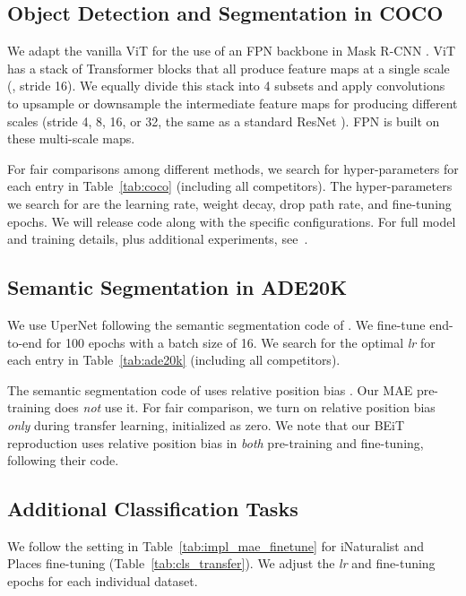 \documentclass[10pt,twocolumn,letterpaper]{article}
\begin{document}
\subsection{Object Detection and Segmentation in COCO}
\label{app:coco}

We adapt the vanilla ViT for the use of an FPN backbone \cite{Lin2017} in Mask R-CNN \cite{He2017}. ViT has a stack of Transformer blocks that all produce feature maps at a single scale (\eg, stride 16). We equally divide this stack into 4 subsets and apply convolutions to upsample or downsample the intermediate feature maps for producing different scales (stride 4, 8, 16, or 32, the same as a standard ResNet \cite{He2016}). FPN is built on these multi-scale maps.

For fair comparisons among different methods, we search for hyper-parameters for each entry in Table~\ref{tab:coco} (including all competitors). The hyper-parameters we search for are the learning rate, weight decay, drop path rate, and fine-tuning epochs. We will release code along with the specific configurations. For full model and training details, plus additional experiments, see~\cite{Li2021}.

\subsection{Semantic Segmentation in ADE20K}
\label{app:ade20k}

We use UperNet \cite{Xiao2018} following the semantic segmentation code of \cite{Bao2021}. We fine-tune end-to-end for 100 epochs with a batch size of 16. We search for the optimal \textit{lr} for each entry in Table~\ref{tab:ade20k} (including all competitors).

The semantic segmentation code of \cite{Bao2021} uses relative position bias \cite{Raffel2020}. Our MAE pre-training does \textit{not} use it. For fair comparison, we turn on relative position bias \textit{only} during transfer learning, initialized as zero. We note that our BEiT reproduction uses relative position bias in \textit{both} pre-training and fine-tuning, following their code.

\subsection{Additional Classification Tasks}
\label{app:class}

We follow the setting in Table~\ref{tab:impl_mae_finetune} for iNaturalist and Places fine-tuning (Table~\ref{tab:cls_transfer}). We adjust the \textit{lr} and fine-tuning epochs for each individual dataset.
\end{document}
